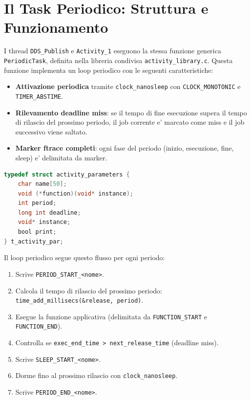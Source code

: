 \section{Il Task Periodico: Struttura e Funzionamento}
\label{sec:periodic_task}

I thread \texttt{DDS\_Publish} e \texttt{Activity\_1} eseguono la stessa
funzione generica \texttt{PeriodicTask}, definita nella libreria condivisa
\texttt{activity\_library.c}. Questa funzione implementa un loop periodico
con le seguenti caratteristiche:

\begin{itemize}
    \item \textbf{Attivazione periodica} tramite \texttt{clock\_nanosleep}
          con \texttt{CLOCK\_MONOTONIC} e \texttt{TIMER\_ABSTIME}.
    \item \textbf{Rilevamento deadline miss}: se il tempo di fine esecuzione
          supera il tempo di rilascio del prossimo periodo, il job corrente
          e' marcato come miss e il job successivo viene saltato.
    \item \textbf{Marker ftrace completi}: ogni fase del periodo
          (inizio, esecuzione, fine, sleep) e' delimitata da marker.
\end{itemize}

\begin{lstlisting}[language=C, caption={Struttura dati per i parametri di attivita'.}, label={lst:activity_par}]
typedef struct activity_parameters {
    char name[50];
    void (*function)(void* instance);
    int period;
    long int deadline;
    void* instance;
    bool print;
} t_activity_par;
\end{lstlisting}

Il loop periodico segue questo flusso per ogni periodo:

\begin{enumerate}
    \item Scrive \texttt{PERIOD\_START\_<nome>}.
    \item Calcola il tempo di rilascio del prossimo periodo:
          \texttt{time\_add\_millisecs(\&release, period)}.
    \item Esegue la funzione applicativa (delimitata da
          \texttt{FUNCTION\_START} e \texttt{FUNCTION\_END}).
    \item Controlla se \texttt{exec\_end\_time > next\_release\_time}
          (deadline miss).
    \item Scrive \texttt{SLEEP\_START\_<nome>}.
    \item Dorme fino al prossimo rilascio con \texttt{clock\_nanosleep}.
    \item Scrive \texttt{PERIOD\_END\_<nome>}.
\end{enumerate}


